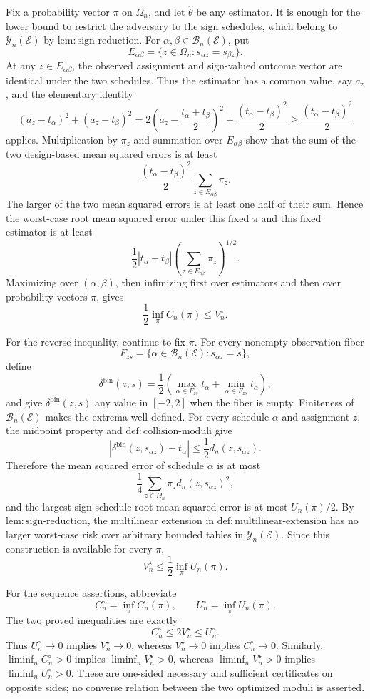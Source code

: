 Fix a probability vector \(\pi\) on \(\Omega_n\), and let \(\widehat\theta\) be any estimator.  It is enough for the lower bound to restrict the adversary to the sign schedules, which belong to \(\mathcal Y_n(\mathcal E)\) by \(\mathrm{lem{:}sign\text{-}reduction}\).  For \(\alpha,\beta\in\mathcal B_n(\mathcal E)\), put
\[
 E_{\alpha\beta}=\{z\in\Omega_n:s_{\alpha z}=s_{\beta z}\}.
\]
At any \(z\in E_{\alpha\beta}\), the observed assignment and sign-valued outcome vector are identical under the two schedules.  Thus the estimator has a common value, say \(a_z\), and the elementary identity
\[
 (a_z-t_\alpha)^2+(a_z-t_\beta)^2
 =2\left(a_z-\frac{t_\alpha+t_\beta}{2}\right)^2
   +\frac{(t_\alpha-t_\beta)^2}{2}
 \ge \frac{(t_\alpha-t_\beta)^2}{2}
\]
applies.  Multiplication by \(\pi_z\) and summation over \(E_{\alpha\beta}\) show that the sum of the two design-based mean squared errors is at least
\[
 \frac{(t_\alpha-t_\beta)^2}{2}
 \sum_{z\in E_{\alpha\beta}}\pi_z.
\]
The larger of the two mean squared errors is at least one half of their sum.  Hence the worst-case root mean squared error under this fixed \(\pi\) and this fixed estimator is at least
\[
 \frac12 |t_\alpha-t_\beta|
 \left(\sum_{z\in E_{\alpha\beta}}\pi_z\right)^{1/2}.
\]
Maximizing over \((\alpha,\beta)\), then infimizing first over estimators and then over probability vectors \(\pi\), gives
\[
 \frac12\inf_\pi C_n(\pi)\le V_n^\star.
\]

For the reverse inequality, continue to fix \(\pi\).  For every nonempty observation fiber
\[
 F_{zs}=\{\alpha\in\mathcal B_n(\mathcal E):s_{\alpha z}=s\},
\]
define
\[
 \delta^{\mathrm{bin}}(z,s)
 =\frac12\left(\max_{\alpha\in F_{zs}}t_\alpha
                    +\min_{\alpha\in F_{zs}}t_\alpha\right),
\]
and give \(\delta^{\mathrm{bin}}(z,s)\) any value in \([-2,2]\) when the fiber is empty.  Finiteness of \(\mathcal B_n(\mathcal E)\) makes the extrema well-defined.  For every schedule \(\alpha\) and assignment \(z\), the midpoint property and \(\mathrm{def{:}collision\text{-}moduli}\) give
\[
 \left|\delta^{\mathrm{bin}}(z,s_{\alpha z})-t_\alpha\right|
 \le \frac12d_n(z,s_{\alpha z}).
\]
Therefore the mean squared error of schedule \(\alpha\) is at most
\[
 \frac14\sum_{z\in\Omega_n}\pi_zd_n(z,s_{\alpha z})^2,
\]
and the largest sign-schedule root mean squared error is at most \(U_n(\pi)/2\).  By \(\mathrm{lem{:}sign\text{-}reduction}\), the multilinear extension in \(\mathrm{def{:}multilinear\text{-}extension}\) has no larger worst-case risk over arbitrary bounded tables in \(\mathcal Y_n(\mathcal E)\).  Since this construction is available for every \(\pi\),
\[
 V_n^\star\le\frac12\inf_\pi U_n(\pi).
\]

For the sequence assertions, abbreviate
\[
 C_n^\circ=\inf_\pi C_n(\pi),
 \qquad
 U_n^\circ=\inf_\pi U_n(\pi).
\]
The two proved inequalities are exactly
\[
 C_n^\circ\le 2V_n^\star\le U_n^\circ.
\]
Thus \(U_n^\circ\to0\) implies \(V_n^\star\to0\), whereas \(V_n^\star\to0\) implies \(C_n^\circ\to0\).  Similarly, \(\liminf_n C_n^\circ>0\) implies \(\liminf_n V_n^\star>0\), whereas \(\liminf_n V_n^\star>0\) implies \(\liminf_n U_n^\circ>0\).  These are one-sided necessary and sufficient certificates on opposite sides; no converse relation between the two optimized moduli is asserted.